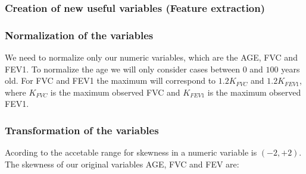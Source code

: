 %
\subsubsection{Creation of new useful variables (Feature extraction)}

\subsubsection{Normalization of the variables}
We need to normalize only our numeric variables, which are the AGE, FVC and FEV1.
To normalize the age we will only consider cases between $0$ and $100$ years old.
For FVC and FEV1 the maximum will correspond to $1.2K_{FVC}$ and $1.2K_{FEV1}$,
where $K_{FVC}$ is the maximum observed FVC and $K_{FEV1}$ is the maximum
observed FEV1.






\subsubsection{Transformation of the variables}
Acording to  the accetable range for skewness in a numeric
variable is $(-2, +2)$. The skewness of our original variables AGE, FVC and FEV are:

